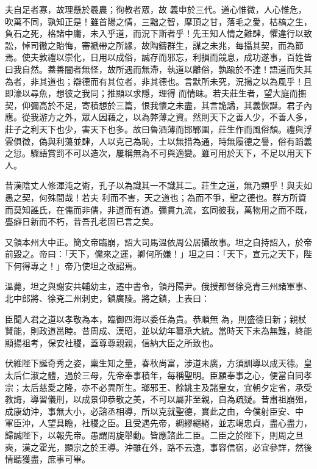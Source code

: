 \begin{pinyinscope}
 夫自足者寡，故理懸於羲農；徇教者眾，故
 義申於三代。道心惟微，人心惟危，吹萬不同，孰知正是！雖首陽之情，三黜之智，摩頂之甘，落毛之愛，枯槁之生，負石之死，格諸中庸，未入乎道，而況下斯者乎！先王知人情之難肆，懼違行以致訟，悼司徹之貽悔，審褫帶之所緣，故陶鑄群生，謀之未兆，每攝其契，而為節焉。使夫敦禮以崇化，日用以成俗，誠存而邪忘，利損而競息，成功遂事，百姓皆曰我自然。蓋善闇者無怪，故所遇而無滯，執道以離俗，孰踰於不達！語道而失其為者，非其道也；辯德而有其位者，非其德也。言默所未究，況揚之以為風乎！且即濠以尋魚，想彼之我同；推顯以求隱，理得
 而情昧。若夫莊生者，望大庭而撫契，仰彌高於不足，寄積想於三篇，恨我懷之未盡，其言詭譎，其義恢誕。君子內應。從我游方之外，眾人因藉之，以為弊薄之資。然則天下之善人少，不善人多，莊子之利天下也少，害天下也多。故曰魯酒薄而邯鄲圍，莊生作而風俗頹。禮與浮雲俱徵，偽與利蕩並肆，人以克己為恥，士以無措為通，時無履德之譽，俗有蹈義之愆。驟語賞罰不可以造次，屢稱無為不可與適變。雖可用於天下，不足以用天下人。



 昔漢陰丈人修渾沌之術，孔子以為識其一不識其二。莊生之道，無乃類乎！與夫如愚之契，何殊間哉！若夫
 利而不害，天之道也；為而不爭，聖之德也。群方所資而莫知誰氏，在儒而非儒，非道而有道。彌貫九流，玄同彼我，萬物用之而不既，亹癖日新而不朽，昔吾孔老固已言之矣。



 又領本州大中正。簡文帝臨崩，詔大司馬溫依周公居攝故事。坦之自持詔入，於帝前毀之。帝曰：「天下，儻來之運，卿何所嫌！」坦之曰：「天下，宣元之天下，陛下何得專之！」帝乃使坦之改詔焉。



 溫薨，坦之與謝安共輔幼主，遷中書令，領丹陽尹。俄授都督徐兗青三州諸軍事、北中郎將、徐兗二州刺史，鎮廣陵。將之鎮，上表曰：



 臣聞人君之道以孝敬為本，臨御四海以委任為貴。恭順無
 為，則盛德日新；親杖賢能，則政道邕睦。昔周成、漢昭，並以幼年纂承大統。當時天下未為無難，終能顯揚祖考，保安社稷，蓋尊尊親親，信納大臣之所致也。



 伏維陛下誕奇秀之姿，稟生知之量，春秋尚富，涉道未廣，方須訓導以成天德。皇太后仁淑之體，過於三母，先帝奉事積年，每稱聖明。臣願奉事之心，便當自同孝宗；太后慈愛之隆，亦不必異所生。瑯邪王、餘姚主及諸皇女，宜朝夕定省，承受教誨，導習儀刑，以成景仰恭敬之美，不可以屬非至親，自為疏疑。昔肅祖崩殂，成康幼沖，事無大小，必諮丞相導，所以克就聖德，實此之由，今僕射臣安、中
 軍臣沖，人望具瞻，社稷之臣。且受遇先帝，綢繆繾綣，並志竭忠貞，盡心盡力，歸誠陛下，以報先帝。愚謂周旋舉動。皆應諮此二臣。二臣之於陛下，則周之旦奭，漢之霍光，顯宗之於王導。沖雖在外，路不云遠，事容信宿，必宜參詳，然後情聽獲盡，庶事可畢。




\end{pinyinscope}
